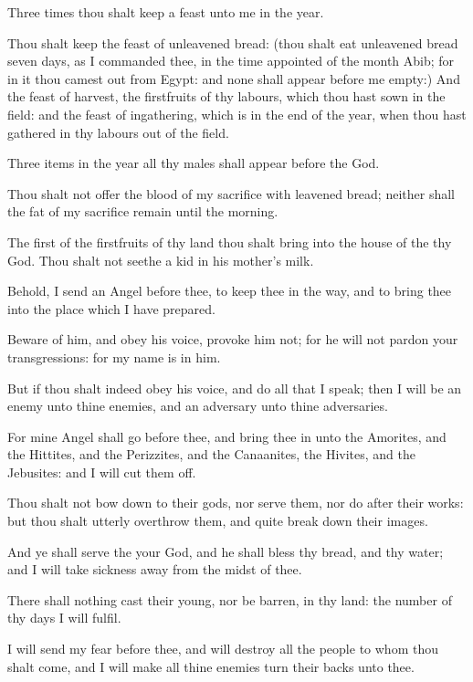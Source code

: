 \verse Three times thou shalt keep a feast unto me in the year.

\verse Thou shalt keep the feast of unleavened bread: (thou shalt eat
unleavened bread seven days, as I commanded thee, in the time
appointed of the month Abib; for in it thou camest out from Egypt: and
none shall appear before me empty:) \verse And the feast of harvest,
the firstfruits of thy labours, which thou hast sown in the field: and
the feast of ingathering, which is in the end of the year, when thou
hast gathered in thy labours out of the field.

\verse Three items in the year all thy males shall appear before the
\LORD God.

\verse Thou shalt not offer the blood of my sacrifice with leavened
bread; neither shall the fat of my sacrifice remain until the morning.

\verse The first of the firstfruits of thy land thou shalt bring into
the house of the \LORD thy God. Thou shalt not seethe a kid in his
mother's milk.

\verse Behold, I send an Angel before thee, to keep thee in the way,
and to bring thee into the place which I have prepared.

\verse Beware of him, and obey his voice, provoke him not; for he will
not pardon your transgressions: for my name is in him.

\verse But if thou shalt indeed obey his voice, and do all that I
speak; then I will be an enemy unto thine enemies, and an adversary
unto thine adversaries.

\verse For mine Angel shall go before thee, and bring thee in unto the
Amorites, and the Hittites, and the Perizzites, and the Canaanites,
the Hivites, and the Jebusites: and I will cut them off.

\verse Thou shalt not bow down to their gods, nor serve them, nor do
after their works: but thou shalt utterly overthrow them, and quite
break down their images.

\verse And ye shall serve the \LORD your God, and he shall bless thy
bread, and thy water; and I will take sickness away from the midst of
thee.

\verse There shall nothing cast their young, nor be barren, in thy
land: the number of thy days I will fulfil.

\verse I will send my fear before thee, and will destroy all the people
to whom thou shalt come, and I will make all thine enemies turn their
backs unto thee.

